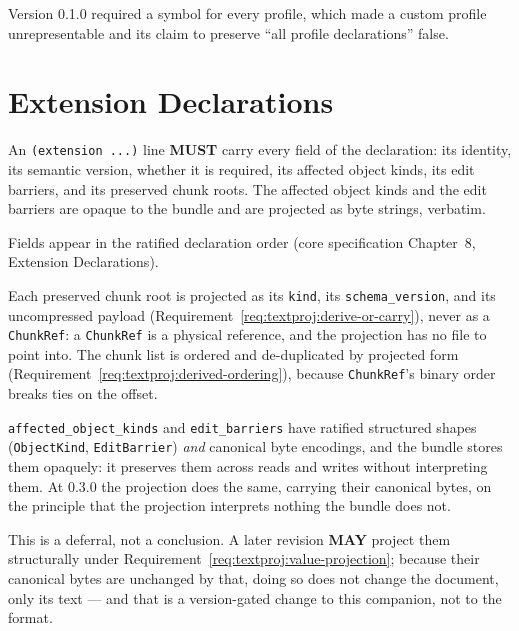 \documentclass[11pt,letterpaper]{report}
\newcommand{\sectionsc}[1]{{\addfontfeatures{Letters=SmallCaps}#1}}
\newcounter{requirement}[chapter]
\newcommand{\MUST}{\textbf{MUST}}
\newcommand{\MAY}{\textbf{MAY}}
\begin{document}
\begin{rationale}
  Version 0.1.0 required a symbol for every profile, which made a custom profile
  unrepresentable and its claim to preserve ``all profile declarations'' false.
\end{rationale}

\section{Extension Declarations}
\label{sec:content:extensions}

\begin{requirement}
  \label{req:textproj:extension-declaration}
  An \texttt{(extension ...)} line \MUST{} carry every field of the declaration:
  its identity, its semantic version, whether it is required, its affected object
  kinds, its edit barriers, and its preserved chunk roots. The affected object
  kinds and the edit barriers are opaque to the bundle and are projected as byte
  strings, verbatim.

  Fields appear in the ratified declaration order (core specification Chapter~8,
  \sectionsc{Extension Declarations}).

  Each preserved chunk root is projected as its \texttt{kind}, its
  \texttt{schema\_version}, and its uncompressed payload
  (Requirement~\ref{req:textproj:derive-or-carry}), never as a
  \texttt{ChunkRef}: a \texttt{ChunkRef} is a physical reference, and the
  projection has no file to point into. The chunk list is ordered and
  de-duplicated by projected form
  (Requirement~\ref{req:textproj:derived-ordering}), because
  \texttt{ChunkRef}'s binary order breaks ties on the offset.
\end{requirement}

\begin{rationale}
  \texttt{affected\_object\_kinds} and \texttt{edit\_barriers} have ratified
  structured shapes (\texttt{ObjectKind}, \texttt{EditBarrier}) \emph{and}
  canonical byte encodings, and the bundle stores them opaquely: it preserves
  them across reads and writes without interpreting them. At 0.3.0 the projection
  does the same, carrying their canonical bytes, on the principle that the
  projection interprets nothing the bundle does not.

  This is a deferral, not a conclusion. A later revision \MAY{} project them
  structurally under
  Requirement~\ref{req:textproj:value-projection}; because their canonical bytes
  are unchanged by that, doing so does not change the document, only its text ---
  and that is a version-gated change to this companion, not to the format.
\end{rationale}
\end{document}

